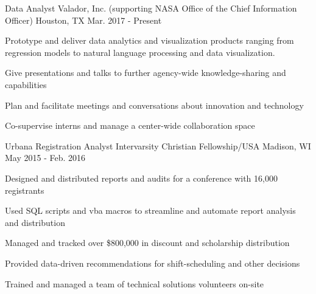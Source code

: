 

\begin{cventries}

  \cventry
    {Data Analyst} %
    {Valador, Inc. (supporting NASA Office of the Chief Information Officer)} %
    {Houston, TX} %
    {Mar. 2017 - Present} %
    {
      \begin{cvitems} %
        \item {Prototype and deliver data analytics and visualization products ranging from regression models to natural language processing and data visualization.}
        \item {Give presentations and talks to further agency-wide knowledge-sharing and capabilities}
        \item {Plan and facilitate meetings and conversations about innovation and technology}
        \item {Co-supervise interns and manage a center-wide collaboration space}
      \end{cvitems}
    }

  \cventry
    {Urbana Registration Analyst} %
    {Intervarsity Christian Fellowship/USA} %
    {Madison, WI} %
    {May 2015 - Feb. 2016} %
    {
      \begin{cvitems} %
        \item {Designed and distributed reports and audits for a conference with 16,000 registrants}
        \item {Used SQL scripts and vba macros to streamline and automate report analysis and distribution}
        \item {Managed and tracked over \$800,000 in discount and scholarship distribution}
        \item {Provided data-driven recommendations for shift-scheduling and other decisions}
        \item {Trained and managed a team of technical solutions volunteers on-site}
      \end{cvitems}
    }


\end{cventries}

